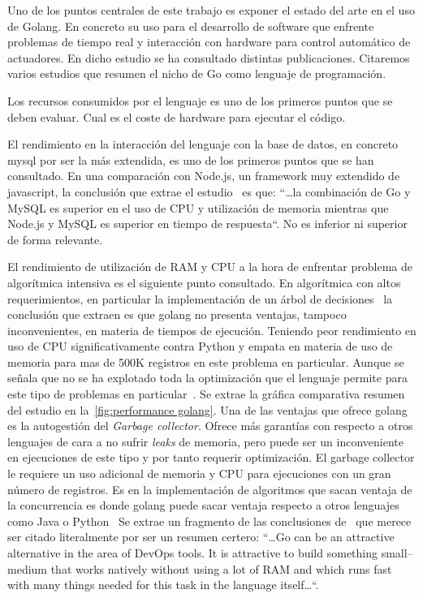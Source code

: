 
Uno de los puntos centrales de este trabajo es exponer el estado del arte en el uso de Golang.
En concreto su uso para el desarrollo de software que enfrente problemas de tiempo real y interacción con hardware para control automático de actuadores.
En dicho estudio se ha consultado distintas publicaciones.
Citaremos varios estudios que resumen el nicho de Go como lenguaje de programación.

Los recursos consumidos por el lenguaje es uno de los primeros puntos que se deben evaluar.
Cual es el coste de hardware para ejecutar el código.

El rendimiento en la interacción del lenguaje con la base de datos, en concreto mysql por ser la más extendida, es uno de los primeros puntos que se han consultado.
En una comparación con Node.js, un framework muy extendido de javascript, la conclusión que extrae el estudio~\cite{Effendy20211955} es que: “\ldots la combinación de Go y MySQL es superior en el uso de CPU y utilización de memoria mientras que Node.js y MySQL es superior en tiempo de respuesta“.
No es inferior ni superior de forma relevante.

El rendimiento de utilización de RAM y CPU a la hora de enfrentar problema de algorítmica intensiva es el siguiente punto consultado.
En algorítmica con altos requerimientos, en particular la implementación de un árbol de decisiones~\cite{Dymora20201} la conclusión que extraen es que golang no presenta ventajas, tampoco inconvenientes, en materia de tiempos de ejecución.
Teniendo peor rendimiento en uso de CPU significativamente contra Python y empata en materia de uso de memoria para mas de 500K registros en este problema en particular.
Aunque se señala que no se ha explotado toda la optimización que el lenguaje permite para este tipo de problemas en particular~\cite{Dymora20201}.
Se extrae la gráfica comparativa resumen del estudio en la~\cref{fig:performance golang}.
Una de las ventajas que ofrece golang es la autogestión del \textit{Garbage collector}.
Ofrece más garantías con respecto a otros lenguajes de cara a no sufrir \textit{leaks} de memoria, pero puede ser un inconveniente en ejecuciones de este tipo y por tanto requerir optimización.
El garbage collector le requiere un uso adicional de memoria y CPU para ejecuciones con un gran número de registros.
Es en la implementación de algoritmos que sacan ventaja de la concurrencia es donde golang puede sacar ventaja respecto a otros lenguajes como Java o Python~\cite{Jenkins201714}
Se extrae un fragmento de las conclusiones de~\cite{Dymora20201} que merece ser citado literalmente por ser un resumen certero:
“\ldots Go can be an attractive alternative in the area of DevOps tools.
It is attractive to build something small–medium that works natively without using a lot of RAM and which runs fast with many things needed for this task in the language itself\ldots“.

